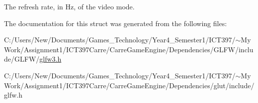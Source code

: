 The refresh rate, in Hz, of the video mode. 

The documentation for this struct was generated from the following files:\begin{CompactItemize}
\item 
C:/Users/New/Documents/Games\_\-Technology/Year4\_\-Semester1/ICT397/$\sim$My Work/Assignment1/ICT397Carre/CarreGameEngine/Dependencies/GLFW/include/GLFW/\hyperlink{glfw3_8h}{glfw3.h}\item 
C:/Users/New/Documents/Games\_\-Technology/Year4\_\-Semester1/ICT397/$\sim$My Work/Assignment1/ICT397Carre/CarreGameEngine/Dependencies/glut/include/glfw.h\end{CompactItemize}
